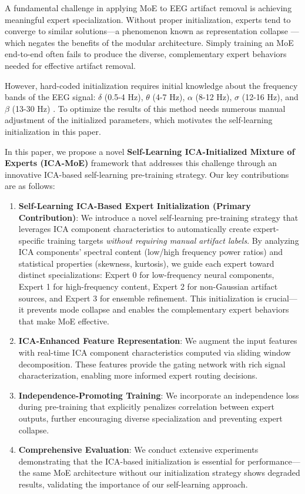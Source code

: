 \documentclass{article}
\begin{document}
A fundamental challenge in applying MoE to EEG artifact removal is achieving meaningful expert specialization. Without proper initialization, experts tend to converge to similar solutions---a phenomenon known as representation collapse \cite{chi2022collapse}---which negates the benefits of the modular architecture. Simply training an MoE end-to-end often fails to produce the diverse, complementary expert behaviors needed for effective artifact removal.

However, hard-coded initialization requires initial knowledge about the frequency bands of the EEG signal: $\delta$ (0.5-4 Hz), $\theta$ (4-7 Hz), $\alpha$ (8-12 Hz), $\sigma$ (12-16 Hz), and $\beta$ (13-30 Hz) \cite{nayak2025waves}. To optimize the results of this method needs numerous manual adjustment of the initialized parameters, which motivates the self-learning initialization in this paper. 

In this paper, we propose a novel \textbf{Self-Learning ICA-Initialized Mixture of Experts (ICA-MoE)} framework that addresses this challenge through an innovative ICA-based self-learning pre-training strategy. Our key contributions are as follows:

\begin{enumerate}
\item \textbf{Self-Learning ICA-Based Expert Initialization (Primary Contribution)}: We introduce a novel self-learning pre-training strategy that leverages ICA component characteristics to automatically create expert-specific training targets \textit{without requiring manual artifact labels}. By analyzing ICA components' spectral content (low/high frequency power ratios) and statistical properties (skewness, kurtosis), we guide each expert toward distinct specializations: Expert 0 for low-frequency neural components, Expert 1 for high-frequency content, Expert 2 for non-Gaussian artifact sources, and Expert 3 for ensemble refinement. This initialization is crucial---it prevents mode collapse and enables the complementary expert behaviors that make MoE effective.

\item \textbf{ICA-Enhanced Feature Representation}: We augment the input features with real-time ICA component characteristics computed via sliding window decomposition. These features provide the gating network with rich signal characterization, enabling more informed expert routing decisions.

\item \textbf{Independence-Promoting Training}: We incorporate an independence loss during pre-training that explicitly penalizes correlation between expert outputs, further encouraging diverse specialization and preventing expert collapse.

\item \textbf{Comprehensive Evaluation}: We conduct extensive experiments demonstrating that the ICA-based initialization is essential for performance---the same MoE architecture without our initialization strategy shows degraded results, validating the importance of our self-learning approach.
\end{enumerate}
\end{document}
